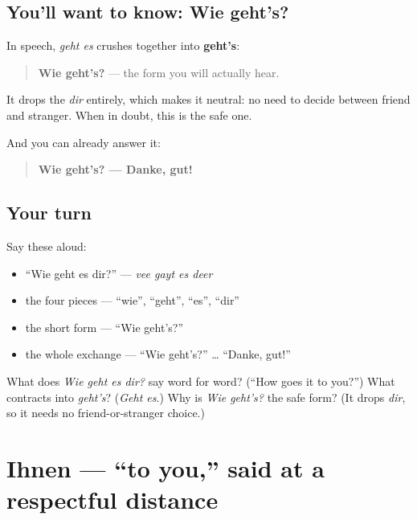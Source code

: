 \subsection*{You'll want to know: Wie geht's?}
In speech, \emph{geht es} crushes together into \textbf{geht's}:

\begin{quote}
\textbf{Wie geht's?} — the form you will actually hear.
\end{quote}

It drops the \emph{dir} entirely, which makes it neutral: no need to decide between friend and stranger. When in doubt, this is the safe one.

And you can already answer it:

\begin{quote}
\textbf{Wie geht's? — Danke, gut!}
\end{quote}

\subsection*{Your turn}
Say these aloud:

\begin{itemize}
\raggedright
  \item \textquotedblleft{}Wie geht es dir?\textquotedblright{} — \emph{vee gayt es deer}
  \item the four pieces — \textquotedblleft{}wie\textquotedblright{}, \textquotedblleft{}geht\textquotedblright{}, \textquotedblleft{}es\textquotedblright{}, \textquotedblleft{}dir\textquotedblright{}
  \item the short form — \textquotedblleft{}Wie geht's?\textquotedblright{}
  \item the whole exchange — \textquotedblleft{}Wie geht's?\textquotedblright{} … \textquotedblleft{}Danke, gut!\textquotedblright{}
\end{itemize}

\begin{tcolorbox}[breakable,colback=teal!4,colframe=teal!35!black,title={Before you move on}]
What does \emph{Wie geht es dir?} say word for word? (\textquotedblleft{}How goes it to you?\textquotedblright{}) What contracts into \emph{geht's}? (\emph{Geht es}.) Why is \emph{Wie geht's?} the safe form? (It drops \emph{dir}, so it needs no friend-or-stranger choice.)
\end{tcolorbox}
\section[Ihnen]{Ihnen — \textquotedblleft{}to you,\textquotedblright{} said at a respectful distance}

